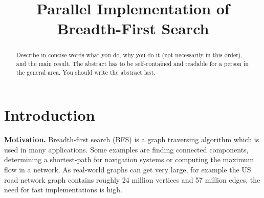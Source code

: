 \documentclass[letterpaper]{article}
\title{Parallel Implementation of Breadth-First Search}
\newcommand{\mypar}[1]{{\bf #1.}}
\begin{document}
%
\maketitle
%



\begin{abstract}
Describe in concise words what you do, why you do it (not necessarily
in this order), and the main result. The abstract has to be
self-contained and readable for a person in the general area. You
should write the abstract last.
\end{abstract}



\section{Introduction}\label{sec:intro}


\mypar{Motivation}
%
%
Breadth-first search (BFS) is a graph traversing algorithm which is used in many applications. Some examples are finding connected components, determining a shortest-path for navigation systems or computing the maximum flow in a network. As real-world graphs can get very large, for example the US road network graph contains roughly 24 million vertices and 57 million edges, the need for fast implementations is high.
\end{document}
